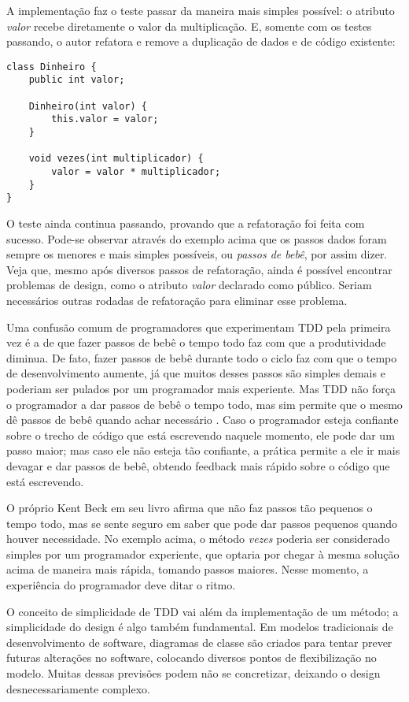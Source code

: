 A implementação faz o teste passar da maneira mais simples possível: o
atributo \textit{valor} recebe diretamente o valor da multiplicação. E, somente com os
testes passando, o autor refatora e remove a duplicação de dados e de código
existente:

\begin{lstlisting}[frame=trbl]
class Dinheiro {
	public int valor;
	
	Dinheiro(int valor) {
		this.valor = valor;
	}
	
	void vezes(int multiplicador) {
		valor = valor * multiplicador;
	}
}
\end{lstlisting}

O teste ainda continua passando, provando que a refatoração foi feita com
sucesso. Pode-se observar através do exemplo acima que os passos dados foram
sempre os menores e mais simples possíveis, ou \textit{passos de bebê}, por
assim dizer. Veja que, mesmo após diversos passos de refatoração, ainda é
possível encontrar problemas de design, como o atributo \textit{valor}
declarado como público. Seriam necessários outras rodadas de refatoração para
eliminar esse problema.

Uma confusão comum de programadores que experimentam TDD pela primeira vez é a
de que fazer passos de bebê o tempo todo faz com que a produtividade diminua.
De fato, fazer passos de bebê durante todo o ciclo faz com que o tempo de
desenvolvimento aumente, já que muitos desses passos são simples demais e
poderiam ser pulados por um programador mais experiente. 
Mas TDD não força o programador a dar passos de bebê o tempo todo, mas sim
permite que o mesmo dê passos de bebê quando achar necessário
\cite{TDDByExample}. Caso o programador esteja confiante sobre o trecho de
código que está escrevendo naquele momento, ele pode dar um passo maior;  mas
caso ele não esteja tão confiante, a prática permite a ele ir mais devagar e 
dar passos de bebê, obtendo feedback mais rápido sobre o código que está
escrevendo.

O próprio Kent Beck em seu livro afirma que não faz passos tão pequenos o tempo
todo, mas se sente seguro em saber que pode dar passos pequenos quando houver
necessidade.
No exemplo acima, o método \textit{vezes} poderia ser considerado simples por
um programador experiente, que optaria por chegar à mesma solução acima de
maneira mais rápida, tomando passos maiores. Nesse momento, a experiência do
programador deve ditar o ritmo.

O conceito de simplicidade de TDD vai além da implementação de um método; a
simplicidade do design é algo também fundamental. Em modelos tradicionais de
desenvolvimento de software, diagramas de classe são criados para tentar prever
futuras alterações no software, colocando diversos pontos de flexibilização no
modelo. Muitas dessas previsões podem não se concretizar, deixando o design
desnecessariamente complexo.

